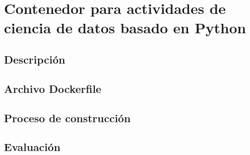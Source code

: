 \section{Contenedor para actividades de ciencia de datos basado en Python}

\subsection{Descripción}

\subsection{Archivo Dockerfile}

\subsection{Proceso de construcción}


\subsection{Evaluación}